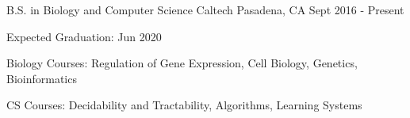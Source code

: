 

\begin{cventries}

  \cventry
    {B.S. in Biology and Computer Science} %
    {Caltech} %
    {Pasadena, CA} %
    {Sept 2016 - Present} %
    {
      \begin{cvitems} %
        \item {Expected Graduation: Jun 2020}
        \item {Biology Courses: Regulation of Gene Expression, Cell Biology, Genetics, Bioinformatics}
        \item {CS Courses: Decidability and Tractability, Algorithms, Learning Systems}
      \end{cvitems}
    }

\end{cventries}
